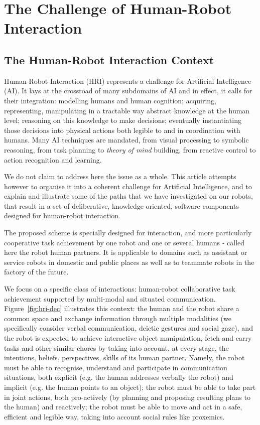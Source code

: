 \documentclass[preprint,3p,times]{elsarticle}
\newcommand{\eg}{e.g.\xspace}
\begin{document}

\section{The Challenge of Human-Robot Interaction}

\subsection{The Human-Robot Interaction Context}

Human-Robot Interaction (HRI) represents a challenge for Artificial Intelligence
(AI). It lays at the crossroad of many subdomains of AI and in effect, it calls
for their integration: modelling humans and human cognition; acquiring,
representing, manipulating in a tractable way abstract knowledge at the human
level; reasoning on this knowledge to make decisions; eventually instantiating
those decisions into physical actions both legible to and in coordination with
humans.  Many AI techniques are mandated, from visual processing to symbolic
reasoning, from task planning to \emph{theory of mind} building, from reactive
control to action recognition and learning.

We do not claim to address here the issue as a whole. This article attempts
however to organise it into a coherent challenge for Artificial Intelligence,
and to explain and illustrate some of the paths that we have investigated on our
robots, that result in a set of deliberative, knowledge-oriented, software
components designed for human-robot interaction.

The proposed scheme is specially designed for  interaction, and more particularly cooperative task achievement by one robot and one or several humans - called here the robot human partners. It is applicable to domains such as assistant or service robots in domestic and public places as well as to teammate robots in the factory of the future.

We focus on a specific class of interactions: human-robot collaborative task achievement
supported by multi-modal and situated communication. Figure~\ref{fig:hri-dec}
illustrates this context: the human and the robot share a common space and exchange
information through multiple modalities (we specifically consider verbal
communication, deictic gestures and social gaze), and the robot is expected to achieve
interactive object manipulation, fetch and carry tasks and other similar
chores by taking into account, at every stage, the intentions, beliefs,
perspectives, skills of its human partner.  Namely, the robot must be able to
recognise, understand and participate in communication situations, both explicit
(\eg the human addresses verbally the robot) and implicit (\eg the human points
to an object); the robot must be able to take part in joint actions, both
pro-actively (by planning and proposing resulting plans to the human) and
reactively; the robot must be able to move and act in a safe, efficient and
legible way, taking into account social rules like proxemics.
\end{document}
